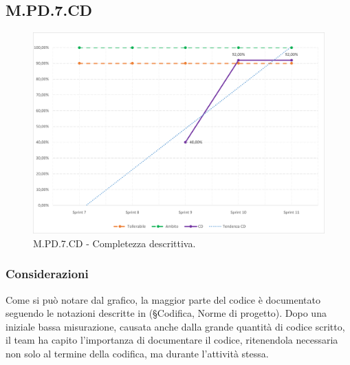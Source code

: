 \documentclass[10pt, a4paper]{article}
\begin{document}
\subsection{M.PD.7.CD}
\begin{figure}[H] \includegraphics[width=15.5cm]{img/metriche/MPD7CD.png} \caption{M.PD.7.CD - Completezza descrittiva.} \end{figure} \subsubsection{Considerazioni}
Come si può notare dal grafico, la maggior parte del codice è documentato seguendo le notazioni descritte in (\S Codifica, Norme di progetto). Dopo una iniziale bassa misurazione, causata anche dalla grande quantità di codice scritto, il team ha capito l'importanza di documentare il codice, ritenendola necessaria non solo al termine della codifica, ma durante l'attività stessa.
\end{document}
